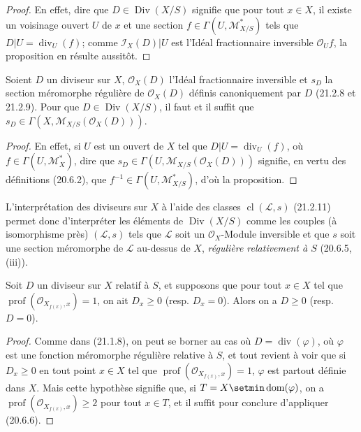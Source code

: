 \begin{proof}
En effet, dire que $D\in\operatorname{Div}(X/S)$ signifie que pour tout $x\in X$, il
existe un voisinage ouvert $U$ de $x$ et une section
$f\in\Gamma(U,\mathscr M_{X/S}^*)$ tels que $D|U=\operatorname{div}_U(f)$; comme
$\mathscr I_X(D)|U$ est l'Idéal fractionnaire inversible $\mathcal O_Uf$, la
proposition en résulte aussitôt.
\end{proof}

\begin{proposition}[21.15.5]
\label{IV.21.15.5}
Soient $D$ un diviseur sur $X$, $\mathcal O_X(D)$ l'Idéal fractionnaire inversible et
$s_D$ la section méromorphe régulière de $\mathcal O_X(D)$ définis canoniquement par
$D$ \textup{(21.2.8 et 21.2.9)}. Pour que $D\in\operatorname{Div}(X/S)$, il faut et il suffit
que $s_D\in\Gamma(X,\mathscr M_{X/S}(\mathcal O_X(D)))$.
\end{proposition}

\begin{proof}
En effet, si $U$ est un ouvert de $X$ tel que $D|U=\operatorname{div}_U(f)$, où
$f\in\Gamma(U,\mathscr M_X^*)$, dire que
$s_D\in\Gamma(U,\mathscr M_{X/S}(\mathcal O_X(D)))$ signifie, en vertu des
définitions (20.6.2), que $f^{-1}\in\Gamma(U,\mathscr M_{X/S}^*)$, d'où la
proposition.
\end{proof}

L'interprétation des diviseurs sur $X$ à l'aide des classes
$\operatorname{cl}(\mathscr L,s)$ (21.2.11) permet donc d'interpréter les éléments de
$\operatorname{Div}(X/S)$ comme les couples (à isomorphisme près) $(\mathscr L,s)$
tels que $\mathscr L$ soit un $\mathcal O_X$-Module inversible et que $s$ soit une
section méromorphe de $\mathscr L$ au-dessus de $X$, \emph{régulière relativement à
$S$} (20.6.5, (iii)).

\begin{proposition}[21.15.6]
\label{IV.21.15.6}
Soit $D$ un diviseur sur $X$ relatif à $S$, et supposons que pour tout $x\in X$ tel
que $\operatorname{prof}(\mathcal O_{X_{f(x)},x})=1$, on ait $D_x\geq0$
\textup{(resp. $D_x=0$)}. Alors on a $D\geq0$ \textup{(resp. $D=0$)}.
\end{proposition}

\begin{proof}
Comme dans (21.1.8), on peut se borner au cas où $D=\operatorname{div}(\varphi)$, où
$\varphi$ est une fonction méromorphe régulière relative à $S$, et tout revient à voir
que si $D_x\geq0$ en tout point $x\in X$ tel que
$\operatorname{prof}(\mathcal O_{X_{f(x)},x})=1$, $\varphi$ est partout définie dans
$X$. Mais cette hypothèse signifie que, si $T=X\setmin\operatorname{dom}(\varphi)$, on a
$\operatorname{prof}(\mathcal O_{X_{f(x)},x})\geq2$ pour tout $x\in T$, et il suffit
pour conclure d'appliquer (20.6.6).
\end{proof}

